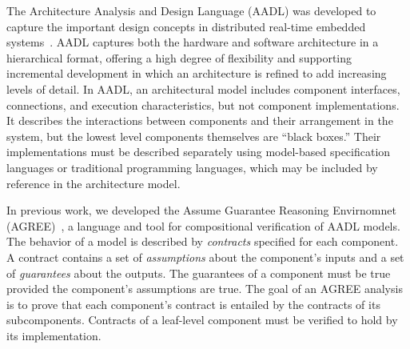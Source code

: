 The Architecture Analysis and Design Language (AADL) was developed to capture the important 
design concepts in distributed real-time embedded systems~\cite{FeilerModelBasedEngineering2012}. 
AADL captures both the hardware and software architecture in a hierarchical format,  
offering a high degree of flexibility and supporting incremental development 
in which an architecture is refined to add increasing levels of detail.
%
In AADL, an architectural model includes component interfaces, connections, and execution characteristics, but not component implementations. It describes the interactions between components and their arrangement in the system, but the lowest level 
components themselves are ``black boxes.'' Their implementations must be described separately using model-based specification languages or traditional programming languages, which may be included by reference in the architecture model.  

In previous work, we developed the Assume Guarantee Reasoning Envirnomnet (AGREE)~\cite{8625938}, a language and tool for compositional verification of AADL models.  The behavior of a model is described by {\em contracts} specified for each component.  A contract contains a set of {\em assumptions} about the component's inputs and a set of {\em guarantees} about the outputs.  The guarantees of a component must be true provided the component's assumptions are true.  The goal of an AGREE analysis is to prove that each component's contract is entailed by the contracts of its subcomponents.  Contracts of a leaf-level component must be verified to hold by its implementation.  

